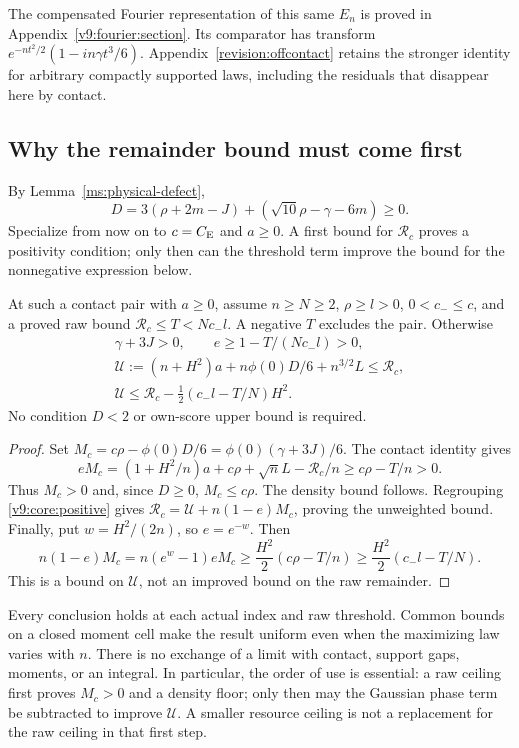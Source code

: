 The compensated Fourier representation of this same $E_n$ is proved in
Appendix~\ref{v9:fourier:section}. Its comparator has transform
$e^{-nt^2/2}(1-in\gamma t^3/6)$. Appendix~\ref{revision:offcontact}
retains the stronger identity for arbitrary compactly supported laws,
including the residuals that disappear here by contact.

\subsection{Why the remainder bound must come first}
By Lemma~\ref{ms:physical-defect},
\begin{equation}\label{v9:core:defect}
 D=3(\rho+2m-J)+(\sqrt{10}\rho-\gamma-6m)\ge0.
\end{equation}
Specialize from now on to $c=C_{\mathrm E}$ and $a\ge0$. A first bound for
$\mathcal R_c$ proves a positivity condition; only then can the
threshold term improve the bound for the nonnegative expression below.

\begin{corollary}\label{v9:core:license}\label{v9:core:phase-price}
At such a contact pair with $a\ge0$, assume $n\ge N\ge2$,
$\rho\ge l>0$, $0<c_-\le c$, and a proved raw bound
$\mathcal R_c\le T<Nc_-l$. A negative $T$ excludes the pair.
Otherwise
\begin{gather*}
 \gamma+3J>0,\qquad e\ge1-T/(Nc_-l)>0,\\
 \mathcal U:=(n+H^2)a+n\phi(0)D/6+n^{3/2}L
       \le\mathcal R_c,\\
 \mathcal U\le\mathcal R_c-\tfrac12(c_-l-T/N)H^2.
\end{gather*}
No condition $D<2$ or own-score upper bound is required.
\end{corollary}
\begin{proof}
Set $M_c=c\rho-\phi(0)D/6=\phi(0)(\gamma+3J)/6$.
The contact identity gives
\[
 eM_c=(1+H^2/n)a+c\rho+\sqrt n L-\mathcal R_c/n
        \ge c\rho-T/n>0.
\]
Thus $M_c>0$ and, since $D\ge0$, $M_c\le c\rho$.
The density bound follows. Regrouping \eqref{v9:core:positive} gives
$\mathcal R_c=\mathcal U+n(1-e)M_c$, proving the unweighted bound.
Finally, put $w=H^2/(2n)$, so $e=e^{-w}$. Then
\[
 n(1-e)M_c=n(e^w-1)eM_c
 \ge\frac{H^2}{2}(c\rho-T/n)
 \ge\frac{H^2}{2}(c_-l-T/N).
\]
This is a bound on $\mathcal U$, not an
improved bound on the raw remainder.
\end{proof}

Every conclusion holds at each actual index and raw threshold. Common
bounds on a closed moment cell make the result uniform even when the
maximizing law varies with $n$. There is no exchange of a limit with
contact, support gaps, moments, or an integral. In particular, the order
of use is essential: a raw ceiling first proves $M_c>0$ and a density
floor; only then may the Gaussian phase term be subtracted to improve
$\mathcal U$. A smaller resource ceiling is not a replacement for the
raw ceiling in that first step.
